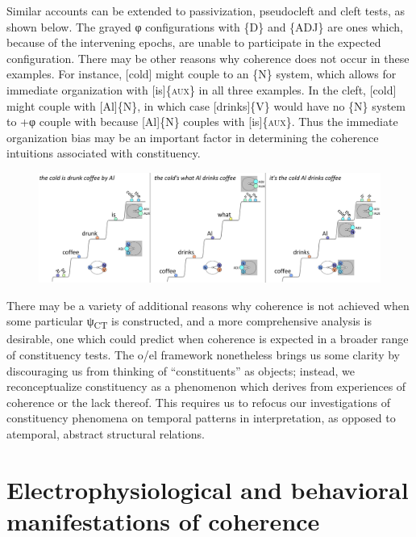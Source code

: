   Similar accounts can be extended to passivization, pseudocleft and cleft tests, as shown below. The grayed φ configurations with \{D\} and \{ADJ\} are ones which, because of the intervening epochs, are unable to participate in the expected configuration. There may be other reasons why coherence does not occur in these examples. For instance, [cold] might couple to an \{N\} system, which allows for immediate organization with [is]\{\textsc{aux}\} in all three examples. In the cleft, [cold] might couple with [Al]\{N\}, in which case [drinks]\{V\} would have no \{N\} system to +φ couple with because [Al]\{N\} couples with [is]\{\textsc{aux\}.} Thus the immediate organization bias may be an important factor in determining the coherence intuitions associated with constituency.   

  
\begin{figure}
\includegraphics[width=\textwidth]{figures/Tilsen-img140.png}
\caption{\missingcaption}
\label{fig:}
\end{figure}
 

  There may be a variety of additional reasons why coherence is not achieved when some particular ψ\textsubscript{CT} is constructed, and a more comprehensive analysis is desirable, one which could predict when coherence is expected in a broader range of constituency tests. The o/el framework nonetheless brings us some clarity by discouraging us from thinking of “constituents” as objects; instead, we reconceptualize constituency as a phenomenon which derives from experiences of coherence or the lack thereof. This requires us to refocus our investigations of constituency phenomena on temporal patterns in interpretation, as opposed to atemporal, abstract structural relations.

\section{Electrophysiological and behavioral manifestations of coherence}

